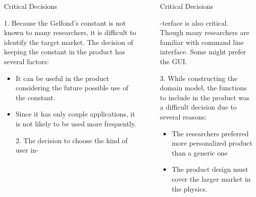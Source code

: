 \documentclass[final]{beamer}
\newlength{\sepwid}
\newlength{\onecolwid}
\newlength{\twocolwid}
\begin{document}
\begin{frame}
\begin{columns}[t]
\begin{column}{\twocolwid}
\begin{columns}[t,totalwidth=\twocolwid]
\begin{column}{\onecolwid}

\begin{exampleblock}{Critical Decisions}

1. Because the Gelfond's constant is not known to many researchers, it is difficult to identify the target market. The decision of keeping the constant in the product has several factors:

\begin{itemize}
\item It can be useful in the product considering the future possible use of the constant.
\item Since it has only couple applications, it is not likely to be used more frequently.

\vspace{1em}
2. The decision to choose the kind of user in-
\end{itemize}

\end{exampleblock}


\end{column} %
\begin{column}{\sepwid}\end{column} %

\begin{column}{\onecolwid} %


\begin{exampleblock}{Critical Decisions}

-terface is also critical. Though many researchers are familiar with command line interface. Some might prefer the GUI.

3. While constructing the domain model, the functions to include in the product was a difficult decision due to several reasons:
\begin{itemize}
    \item The researchers preferred more personalized product than a generic one
    \item The product design must cover the larger market in the physics.
\end{itemize}


\end{exampleblock}
\end{column}
\end{columns}
\end{column}
\end{columns}
\end{frame}
\end{document}
